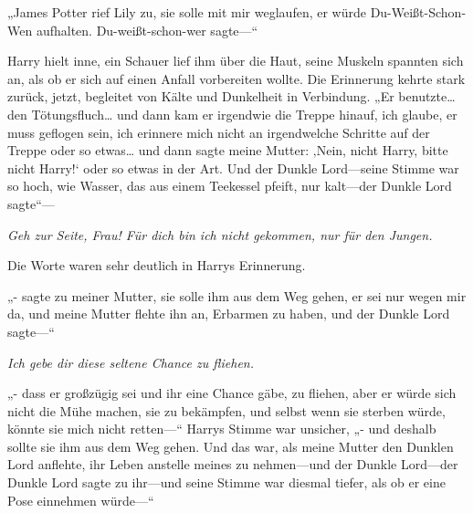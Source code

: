 „James Potter rief Lily zu, sie solle mit mir weglaufen, er würde Du-Weißt-Schon-Wen aufhalten. Du-weißt-schon-wer sagte—“

Harry hielt inne, ein Schauer lief ihm über die Haut, seine Muskeln spannten sich an, als ob er sich auf einen Anfall vorbereiten wollte. Die Erinnerung kehrte stark zurück, jetzt, begleitet von Kälte und Dunkelheit in Verbindung.
„Er benutzte… den Tötungsfluch… und dann kam er irgendwie die Treppe hinauf, ich glaube, er muss geflogen sein, ich erinnere mich nicht an irgendwelche Schritte auf der Treppe oder so etwas… und dann sagte meine Mutter: ‚Nein, nicht Harry, bitte nicht Harry!‘ oder so etwas in der Art. Und der Dunkle Lord—seine Stimme war so hoch, wie Wasser, das aus einem Teekessel pfeift, nur kalt—der Dunkle Lord sagte“—

\emph{Geh zur Seite, Frau! Für dich bin ich nicht gekommen, nur für den Jungen.}

Die Worte waren sehr deutlich in Harrys Erinnerung.

„- sagte zu meiner Mutter, sie solle ihm aus dem Weg gehen, er sei nur wegen mir da, und meine Mutter flehte ihn an, Erbarmen zu haben, und der Dunkle Lord sagte—“

\emph{Ich gebe dir diese seltene Chance zu fliehen.}

„- dass er großzügig sei und ihr eine Chance gäbe, zu fliehen, aber er würde sich nicht die Mühe machen, sie zu bekämpfen, und selbst wenn sie sterben würde, könnte sie mich nicht retten—“ Harrys Stimme war unsicher, „- und deshalb sollte sie ihm aus dem Weg gehen. Und das war, als meine Mutter den Dunklen Lord anflehte, ihr Leben anstelle meines zu nehmen—und der Dunkle Lord—der Dunkle Lord sagte zu ihr—und seine Stimme war diesmal tiefer, als ob er eine Pose einnehmen würde—“

